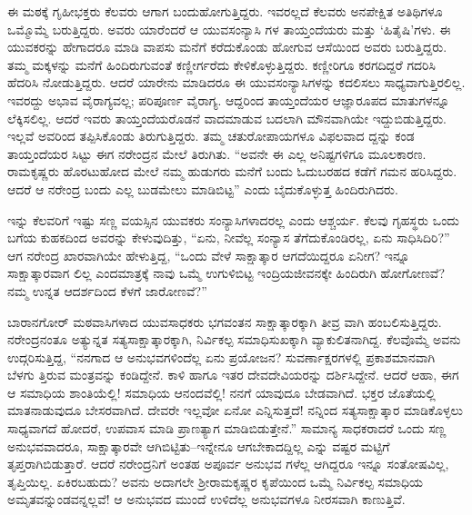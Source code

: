 ಈ ಮಠಕ್ಕೆ ಗೃಹೀಭಕ್ತರು ಕೆಲವರು ಆಗಾಗ ಬಂದುಹೋಗುತ್ತಿದ್ದರು. ಇವರಲ್ಲದೆ ಕೆಲವರು ಅನಪೇಕ್ಷಿತ ಅತಿಥಿಗಳೂ ಒಮ್ಮೊಮ್ಮೆ ಬರುತ್ತಿದ್ದರು. ಅವರು ಯಾರೆಂದರೆ ಆ ಯುವಸಂನ್ಯಾಸಿ ಗಳ ತಾಯ್ತಂದೆಯರು ಮತ್ತು ‘ಹಿತೈಷಿ’ಗಳು. ಈ ಯುವಕರನ್ನು ಹೇಗಾದರೂ ಮಾಡಿ ವಾಪಸು ಮನೆಗೆ ಕರೆದುಕೊಂಡು ಹೋಗುವ ಆಸೆಯಿಂದ ಅವರು ಬರುತ್ತಿದ್ದರು. ತಮ್ಮ ಮಕ್ಕಳನ್ನು ಮನೆಗೆ ಹಿಂದಿರುಗುವಂತೆ ಕಣ್ಣೀರ್ಗರೆದು ಕೇಳಿಕೊಳ್ಳುತ್ತಿದ್ದರು. ಕಣ್ಣೀರಿಗೂ ಕರಗದಿದ್ದರೆ ಗದರಿಸಿ ಹೆದರಿಸಿ ನೋಡುತ್ತಿದ್ದರು. ಆದರೆ ಯಾರೇನು ಮಾಡಿದರೂ ಈ ಯುವಸಂನ್ಯಾಸಿಗಳನ್ನು ಕದಲಿಸಲು ಸಾಧ್ಯವಾಗುತ್ತಿರಲಿಲ್ಲ. ಇವರದ್ದು ಅಭಾವ ವೈರಾಗ್ಯವಲ್ಲ; ಪರಿಪೂರ್ಣ ವೈರಾಗ್ಯ. ಆದ್ದರಿಂದ ತಾಯ್ತಂದೆಯರ ಆಜ್ಞಾರೂಪದ ಮಾತುಗಳನ್ನೂ ಲೆಕ್ಕಿಸಲಿಲ್ಲ. ಆದರೆ ಇವರು ತಾಯ್ತಂದೆಯರೊಡನೆ ವಾದಮಾಡುವ ಬದಲಾಗಿ ಮೌನವಾಗಿಯೇ ಇದ್ದುಬಿಡುತ್ತಿದ್ದರು. ಇಲ್ಲವೆ ಅವರಿಂದ ತಪ್ಪಿಸಿಕೊಂಡು ತಿರುಗುತ್ತಿದ್ದರು. ತಮ್ಮ ಚತುರೋಪಾಯಗಳೂ ವಿಫಲವಾದ ದ್ದನ್ನು ಕಂಡ ತಾಯ್ತಂದೆಯರ ಸಿಟ್ಟು ಈಗ ನರೇಂದ್ರನ ಮೇಲೆ ತಿರುಗಿತು. “ಅವನೇ ಈ ಎಲ್ಲ ಅನಿಷ್ಟಗಳಿಗೂ ಮೂಲಕಾರಣ. ರಾಮಕೃಷ್ಣರು ಹೊರಟುಹೋದ ಮೇಲೆ ನಮ್ಮ ಹುಡುಗರು ಮನೆಗೆ ಬಂದು ಓದುಬರಹದ ಕಡೆಗೆ ಗಮನ ಹರಿಸಿದ್ದರು. ಆದರೆ ಆ ನರೇಂದ್ರ ಬಂದು ಎಲ್ಲ ಬುಡಮೇಲು ಮಾಡಿಬಿಟ್ಟ” ಎಂದು ಬೈದುಕೊಳ್ಳುತ್ತ ಹಿಂದಿರುಗಿದರು.

ಇನ್ನು ಕೆಲವರಿಗೆ ಇಷ್ಟು ಸಣ್ಣ ವಯಸ್ಸಿನ ಯುವಕರು ಸಂನ್ಯಾಸಿಗಳಾದರಲ್ಲ ಎಂದು ಆಶ್ಚರ್ಯ. ಕೆಲವು ಗೃಹಸ್ಥರು ಒಂದು ಬಗೆಯ ಕುಹಕದಿಂದ ಅವರನ್ನು ಕೇಳುವುದಿತ್ತು, “ಏನು, ನೀವೆಲ್ಲ ಸಂನ್ಯಾಸ ತೆಗೆದುಕೊಂಡಿರಲ್ಲ, ಏನು ಸಾಧಿಸಿದಿರಿ?” ಆಗ ನರೇಂದ್ರ ಖಾರವಾಗಿಯೇ ಹೇಳುತ್ತಿದ್ದ, “ಒಂದು ವೇಳೆ ಸಾಕ್ಷಾತ್ಕಾರ ಆಗದೆಯಿದ್ದರೂ ಏನೀಗ? ಇನ್ನೂ ಸಾಕ್ಷಾತ್ಕಾರವಾಗ ಲಿಲ್ಲ ಎಂದಮಾತ್ರಕ್ಕೆ ನಾವು ಒಮ್ಮೆ ಉಗುಳಿಬಿಟ್ಟ ಇಂದ್ರಿಯಜೀವನಕ್ಕೇ ಹಿಂದಿರುಗಿ ಹೋಗೋಣವೆ? ನಮ್ಮ ಉನ್ನತ ಆದರ್ಶದಿಂದ ಕೆಳಗೆ ಜಾರೋಣವೆ?”

ಬಾರಾನಗೋರ್ ಮಠವಾಸಿಗಳಾದ ಯುವಸಾಧಕರು ಭಗವಂತನ ಸಾಕ್ಷಾತ್ಕಾರಕ್ಕಾಗಿ ತೀವ್ರ ವಾಗಿ ಹಂಬಲಿಸುತ್ತಿದ್ದರು. ನರೇಂದ್ರನಂತೂ ಅತ್ಯುನ್ನತ ಸತ್ಯಸಾಕ್ಷಾತ್ಕಾರಕ್ಕಾಗಿ, ನಿರ್ವಿಕಲ್ಪ ಸಮಾಧಿಸುಖಕ್ಕಾಗಿ ವ್ಯಾಕುಲಿತನಾಗಿದ್ದ. ಕೆಲವೊಮ್ಮೆ ಅವನು ಉದ್ಗರಿಸುತ್ತಿದ್ದ, “ನನಗಾದ ಆ ಅನುಭವಗಳಿಂದೆಲ್ಲ ಏನು ಪ್ರಯೋಜನ? ಸುವರ್ಣಾಕ್ಷರಗಳಲ್ಲಿ ಪ್ರಕಾಶಮಾನವಾಗಿ ಬೆಳಗು ತ್ತಿರುವ ಮಂತ್ರವನ್ನು ಕಂಡಿದ್ದೇನೆ. ಕಾಳಿ ಹಾಗೂ ಇತರ ದೇವದೇವಿಯರನ್ನು ದರ್ಶಿಸಿದ್ದೇನೆ. ಆದರೆ ಆಹಾ, ಈಗ ಆ ಸಮಾಧಿಯ ಶಾಂತಿಯೆಲ್ಲಿ! ಸಮಾಧಿಯ ಆನಂದವೆಲ್ಲಿ! ನನಗೆ ಯಾವುದೂ ಬೇಡವಾಗಿದೆ. ಭಕ್ತರ ಜೊತೆಯಲ್ಲಿ ಮಾತನಾಡುವುದೂ ಬೇಸರವಾಗಿದೆ. ದೇವರೇ ಇಲ್ಲವೋ ಏನೋ ಎನ್ನಿಸುತ್ತದೆ! ನನ್ನಿಂದ ಸತ್ಯಸಾಕ್ಷಾತ್ಕಾರ ಮಾಡಿಕೊಳ್ಳಲು ಸಾಧ್ಯವಾಗದೆ ಹೋದರೆ, ಉಪವಾಸ ಮಾಡಿ ಪ್ರಾಣತ್ಯಾಗ ಮಾಡಿಬಿಡುತ್ತೇನೆ.” ಸಾಮಾನ್ಯ ಸಾಧಕರಾದರೆ ಒಂದು ಸಣ್ಣ ಅನುಭವವಾದರೂ, ಸಾಕ್ಷಾತ್ಕಾರವೇ ಆಗಿಬಿಟ್ಟಿತು–ಇನ್ನೇನೂ ಆಗಬೇಕಾದದ್ದಿಲ್ಲ ಎನ್ನು ವಷ್ಟರ ಮಟ್ಟಿಗೆ ತೃಪ್ತರಾಗಿಬಿಡುತ್ತಾರೆ. ಆದರೆ ನರೇಂದ್ರನಿಗೆ ಅಂತಹ ಅಪೂರ್ವ ಅನುಭವ ಗಳೆಲ್ಲ ಆಗಿದ್ದರೂ ಇನ್ನೂ ಸಂತೋಷವಿಲ್ಲ, ತೃಪ್ತಿಯಿಲ್ಲ. ಏಕಿರಬಹುದು? ಅವನು ಅದಾಗಲೇ ಶ್ರೀರಾಮಕೃಷ್ಣರ ಕೃಪೆಯಿಂದ ಒಮ್ಮೆ ನಿರ್ವಿಕಲ್ಪ ಸಮಾಧಿಯ ಅಮೃತವನ್ನುಂಡವನ್ನಲ್ಲವೆ! ಆ ಅನುಭವದ ಮುಂದೆ ಉಳಿದೆಲ್ಲ ಅನುಭವಗಳೂ ನೀರಸವಾಗಿ ಕಾಣುತ್ತಿವೆ.

